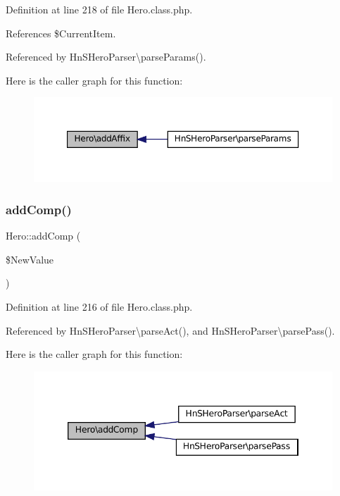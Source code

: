 Definition at line 218 of file Hero.\+class.\+php.



References \$\+Current\+Item.



Referenced by Hn\+S\+Hero\+Parser\textbackslash{}parse\+Params().

Here is the caller graph for this function\+:\nopagebreak
\begin{figure}[H]
\begin{center}
\leavevmode
\includegraphics[width=350pt]{class_hero_aa6fb2135453af0ad7c16960f5d0a8412_icgraph}
\end{center}
\end{figure}
\mbox{\label{class_hero_aad51972665b665b8bf3c7af439649197}} 
\subsubsection{\texorpdfstring{add\+Comp()}{addComp()}}
{\footnotesize\ttfamily Hero\+::add\+Comp (\begin{DoxyParamCaption}\item[{}]{\$\+New\+Value }\end{DoxyParamCaption})}



Definition at line 216 of file Hero.\+class.\+php.



Referenced by Hn\+S\+Hero\+Parser\textbackslash{}parse\+Act(), and Hn\+S\+Hero\+Parser\textbackslash{}parse\+Pass().

Here is the caller graph for this function\+:\nopagebreak
\begin{figure}[H]
\begin{center}
\leavevmode
\includegraphics[width=346pt]{class_hero_aad51972665b665b8bf3c7af439649197_icgraph}
\end{center}
\end{figure}
\mbox{\label{class_hero_a089b98df69d37bcffa4daed4e0bde01b}} 

